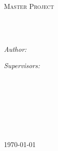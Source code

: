 \documentclass[
11pt, %
english, %
singlespacing, %
nolistspacing, %
liststotoc, %
headsepline, %
]{MastersDoctoralThesis} %
\author{Benoît \textsc{Richard}} %
\begin{document}
\frontmatter %

\pagestyle{plain} %


\begin{titlepage}
\begin{center}

\vspace*{.06\textheight}
{\scshape\LARGE \univname\par}\vspace{1.5cm} %
\textsc{\Large Master Project}\\[0.5cm] %

\HRule \\[0.4cm] %
{\huge \bfseries \ttitle\par}\vspace{0.4cm} %
\HRule \\[1.5cm] %
 
\begin{minipage}[t]{0.4\textwidth}
\begin{flushleft} \large
\emph{Author:}\\
\authorname
\end{flushleft}
\end{minipage}
\begin{minipage}[t]{0.4\textwidth}
\begin{flushright} \large
\emph{Supervisors:} \\
\supname
\end{flushright}
\end{minipage}\\[3cm]
 
\vfill

\large \textit{}\\[0.3cm] %
\textit{}\\[0.4cm]
\groupname\\\deptname\\[2cm] %
 
\vfill

{\large \today}\\[4cm] %
 
\vfill
\end{center}
\end{titlepage}
\end{document}

